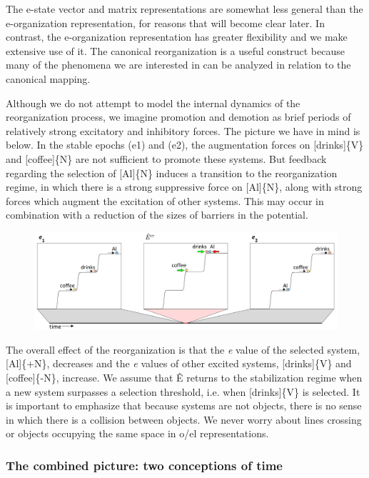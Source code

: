   The e-state vector and matrix representations are somewhat less general than the e-organization representation, for reasons that will become clear later. In contrast, the e-organization representation has greater flexibility and we make extensive use of it. The canonical reorganization is a useful construct because many of the phenomena we are interested in can be analyzed in relation to the canonical mapping.

  Although we do not attempt to model the internal dynamics of the reorganization process, we imagine promotion and demotion as brief periods of relatively strong excitatory and inhibitory forces. The picture we have in mind is below. In the stable epochs (e1) and (e2), the augmentation forces on [drinks]\{V\} and [coffee]\{N\} are not sufficient to promote these systems. But feedback regarding the selection of [Al]\{N\} induces a transition to the reorganization regime, in which there is a strong suppressive force on [Al]\{N\}, along with strong forces which augment the excitation of other systems. This may occur in combination with a reduction of the sizes of barriers in the potential. 

  
\begin{figure}
\includegraphics[width=\textwidth]{figures/Tilsen-img26.png}
\caption{\missingcaption}
\label{fig:}
\end{figure}
 

  The overall effect of the reorganization is that the \textit{e} value of the selected system, [Al]\{+N\}, decreases and the \textit{e} values of other excited systems, [drinks]\{V\} and [coffee]\{-N\}, increase. We assume that Ê returns to the stabilization regime when a new system surpasses a selection threshold, i.e. when [drinks]\{V\} is selected. It is important to emphasize that because systems are not objects, there is no sense in which there is a collision between objects. We never worry about lines crossing or objects occupying the same space in o/el representations.

\subsubsection{The combined picture: two conceptions of time}

